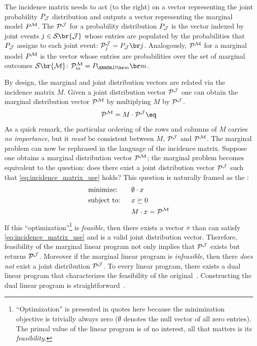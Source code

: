 \documentclass[aps, 10pt, english, twoside, pra, nofootinbib, tightenlines, longbibliography, superscriptaddress]{revtex4-1}
\renewcommand{\Events}[1]{\mathcal{S}\br{#1}} %
\begin{document}
    The incidence matrix needs to act (to the right) on a vector representing the joint probability $\prob[\jointvar]$ distribution and outputs a vector representing the marginal model $\prob^{\mscenario}$. The  $\probvec^{\jointvar}$ for a probability distribution $\prob[\jointvar]$ is the vector indexed by joint events $j \in \Events{\jointvar}$ whose entries are populated by the probabilities that $\prob[\jointvar]$ assigns to each joint event: $\probvec^{\jointvar}_j = \prob[\jointvar][j]$. Analogously,  $\probvec^{\mscenario}$ for a marginal model $\prob^{\mscenario}$ is the vector whose entries are probabilities over the set of marginal outcomes $\Events{\mscenario}$: $\probvec^{\mscenario}_m = \prob[\Dom{m}][m]$.

    By design, the marginal and joint distribution vectors are related via the incidence matrix $M$. Given a joint distribution vector $\probvec^{\jointvar}$ one can obtain the marginal distribution vector $\probvec^{\mscenario}$ by multiplying $M$ by $\probvec^{\jointvar}$.
    \[ \probvec^{\mscenario} = M \cdot \probvec^{\jointvar} \eq \label{eq:incidence_matrix_use} \]
    As a quick remark, the particular ordering of the rows and columns of $M$ carries \textit{no importance}, but it \textit{must} be consistent between $M$, $\probvec^{\jointvar}$ and $\probvec^{\mscenario}$. The marginal problem can now be rephrased in the language of the incidence matrix. Suppose one obtains a marginal distribution vector $\probvec^{\mscenario}$; the marginal problem becomes equivalent to the question: does there exist a joint distribution vector $\probvec^{\jointvar}$ such that \cref{eq:incidence_matrix_use} holds? This question is naturally framed as the :
    \begin{alignat*}{2}
        & \text{minimize:} \quad&& \emptyset \cdot x\\
        & \text{subject to:} && x \succeq 0 \\
        & && M \cdot x = \probvec^{\mscenario}
    \end{alignat*}
    If this ``optimization''\footnote{``Optimization'' is presented in quotes here because the minimization objective is trivially always zero ($\emptyset$ denotes the null vector of all zero entries). The primal value of the linear program is of no interest, all that matters is its \textit{feasibility}.} is \textit{feasible}, then there exists a vector $x$ than can satisfy \cref{eq:incidence_matrix_use} and is a valid joint distribution vector. Therefore, feasibility of the marginal linear program not only implies that $\probvec^{\jointvar}$ exists but returns $\probvec^{\jointvar}$. Moreover if the marginal linear program is \textit{infeasible}, then there \textit{does not} exist a joint distribution $\probvec^{\jointvar}$. To every linear program, there exists a dual linear program that characterizes the feasibility of the original~\cite{Schrijver_1998}. Constructing the dual linear program is straightforward~\cite{Lahaie_2008}.
\end{document}
